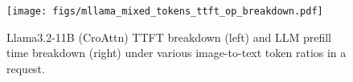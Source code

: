 \begin{figure}[!t]
    \centering
    \texttt{[image: figs/mllama\_mixed\_tokens\_ttft\_op\_breakdown.pdf]}
    \caption{Llama3.2-11B (CroAttn) TTFT breakdown (left) and LLM prefill time breakdown (right) under various image-to-text token ratios in a request.
    }
    \label{fig:variation-ttft-mixed-tokens}
\end{figure}